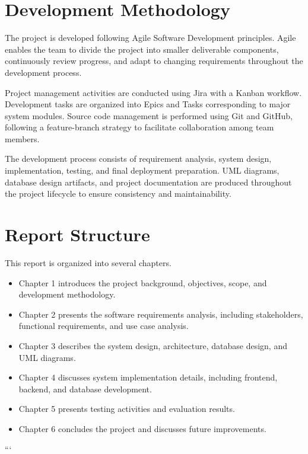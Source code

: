\section{Development Methodology}

The project is developed following Agile Software Development principles. Agile enables the team to divide the project into smaller deliverable components, continuously review progress, and adapt to changing requirements throughout the development process.

Project management activities are conducted using Jira with a Kanban workflow. Development tasks are organized into Epics and Tasks corresponding to major system modules. Source code management is performed using Git and GitHub, following a feature-branch strategy to facilitate collaboration among team members.

The development process consists of requirement analysis, system design, implementation, testing, and final deployment preparation. UML diagrams, database design artifacts, and project documentation are produced throughout the project lifecycle to ensure consistency and maintainability.

\section{Report Structure}

This report is organized into several chapters.

\begin{itemize}
	\item Chapter 1 introduces the project background, objectives, scope, and development methodology.
	\item Chapter 2 presents the software requirements analysis, including stakeholders, functional requirements, and use case analysis.
	\item Chapter 3 describes the system design, architecture, database design, and UML diagrams.
	\item Chapter 4 discusses system implementation details, including frontend, backend, and database development.
	\item Chapter 5 presents testing activities and evaluation results.
	\item Chapter 6 concludes the project and discusses future improvements.
\end{itemize}
```

